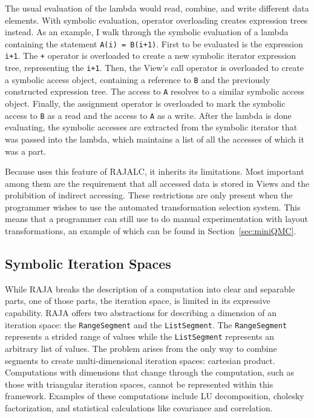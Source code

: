 The usual evaluation of the lambda would read, combine, and write different data elements.
With symbolic evaluation, operator overloading creates expression trees instead.
As an example, I walk through the symbolic evaluation of a lambda containing the statement \verb.A(i) = B(i+1)..
First to be evaluated is the expression \verb.i+1.. 
The \verb.+. operator is overloaded to create a new symbolic iterator expression tree, representing the \verb.i+1.. 
Then, the View's call operator is overloaded to create a symbolic access object, containing a reference to \verb.B. and the previously constructed expression tree.
The access to \verb.A. resolves to a similar symbolic access object.
Finally, the assignment operator is overloaded to mark the symbolic access to \verb.B. as a read and the access to \verb.A. as a write.
After the lambda is done evaluating, the symbolic accesses are extracted from the symbolic iterator that was passed into the lambda, which maintains a list of all the accesses of which it was a part.

Because \FormatDecisions{} uses this feature of RAJALC, it inherits its limitations.
Most important among them are the requirement that all accessed data is stored in Views and the prohibition of indirect accessing.
These restrictions are only present when the programmer wishes to use the automated transformation selection system. 
This means that a programmer can still use \FormatDecisions{} to do manual experimentation with layout transformations, an example of which can be found in Section~\ref{sec:miniQMC}.

\subsection{Symbolic Iteration Spaces}\label{sec:SymbolicSegment}
While RAJA breaks the description of a computation into clear and separable parts, one of those parts, the iteration space, is limited in its expressive capability.
RAJA offers two abstractions for describing a dimension of an iteration space: the \verb.RangeSegment. and the \verb.ListSegment..
The \verb.RangeSegment. represents a strided range of values while the \verb.ListSegment. represents an arbitrary list of values.
The problem arises from the only way to combine segments to create multi-dimensional iteration spaces: cartesian product.
Computations with dimensions that change through the computation, such as those with triangular iteration spaces, cannot be represented within this framework.
Examples of these computations include LU decomposition, cholesky factorization, and statistical calculations like covariance and correlation.


